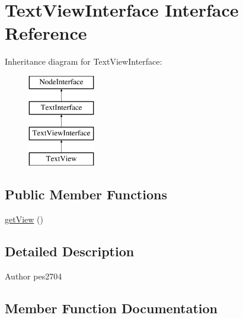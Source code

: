 \hypertarget{interface_pes_1_1_dom_1_1_node_1_1_text_1_1_text_view_interface}{}\section{Text\+View\+Interface Interface Reference}
\label{interface_pes_1_1_dom_1_1_node_1_1_text_1_1_text_view_interface}
Inheritance diagram for Text\+View\+Interface\+:\begin{figure}[H]
\begin{center}
\leavevmode
\includegraphics[height=4.000000cm]{interface_pes_1_1_dom_1_1_node_1_1_text_1_1_text_view_interface}
\end{center}
\end{figure}
\subsection*{Public Member Functions}
\begin{DoxyCompactItemize}
\item 
\mbox{\hyperlink{interface_pes_1_1_dom_1_1_node_1_1_text_1_1_text_view_interface_a50677812ea3f0258f7d03bbac5265413}{get\+View}} ()
\end{DoxyCompactItemize}


\subsection{Detailed Description}
\begin{DoxyAuthor}{Author}
pes2704 
\end{DoxyAuthor}


\subsection{Member Function Documentation}
\mbox{\label{interface_pes_1_1_dom_1_1_node_1_1_text_1_1_text_view_interface_a50677812ea3f0258f7d03bbac5265413}} 
